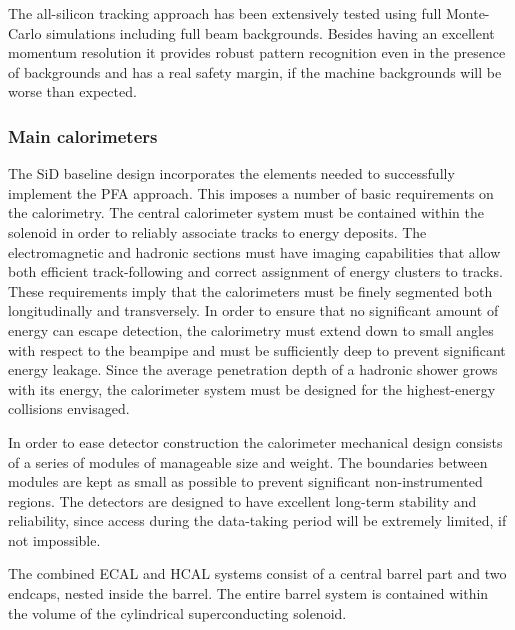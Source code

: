 The all-silicon tracking approach has been extensively tested using full Monte-Carlo
simulations including full beam backgrounds. Besides having an excellent momentum resolution
it provides robust pattern recognition even in the presence of backgrounds and has a
real safety margin, if the machine backgrounds will be worse than expected.

\subsubsection{Main calorimeters}

The SiD  baseline design incorporates the elements needed to
successfully implement the PFA approach. This imposes a number of
basic requirements on the calorimetry. The central calorimeter
system must be contained within the solenoid in order to reliably associate
tracks to energy deposits. The electromagnetic and hadronic sections
must have imaging capabilities that allow both efficient
track-following and correct assignment of energy clusters to tracks. These
requirements imply that the calorimeters must be finely segmented both
longitudinally and transversely. In order to ensure that no significant amount
of energy can escape detection, the calorimetry must extend down to small
angles with respect to the beampipe and must be sufficiently deep to prevent
significant energy leakage. Since the average penetration depth of a hadronic
shower grows with its energy, the calorimeter system must be designed for the
highest-energy collisions envisaged.

In order to ease detector construction the calorimeter mechanical design consists of a series of modules of
manageable size and weight. The boundaries between
modules are kept as small as possible to prevent significant non-instrumented
regions. The detectors are designed to have excellent long-term stability and reliability,
since access during the data-taking period will be extremely limited, if not
impossible.

The combined ECAL and HCAL systems consist of a
central barrel part and two endcaps, nested inside the barrel. The entire barrel system is contained
within the volume of the cylindrical superconducting solenoid. 



